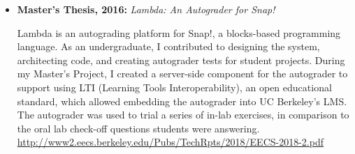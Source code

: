 \begin{itemize}

  \setlength\itemsep{1em}
  
  \item \textbf{Master's Thesis, 2016:} \textit{Lambda: An Autograder for Snap!}

    \small{Lambda is an autograding platform for Snap!, a blocks-based programming language. As an undergraduate, I contributed to designing the system, architecting code, and creating autograder tests for student projects. During my Master's Project, I created a server-side component for the autograder to support using LTI (Learning Tools Interoperability), an open educational standard, which allowed embedding the autograder into UC Berkeley's LMS. The autograder was used to trial a series of in-lab exercises, in comparison to the oral lab check-off questions students were answering.}
    \linebreak
    \small{\href{http://www2.eecs.berkeley.edu/Pubs/TechRpts/2018/EECS-2018-2.pdf}{http://www2.eecs.berkeley.edu/Pubs/TechRpts/2018/EECS-2018-2.pdf}}

\end{itemize}

\vspace{2pt}